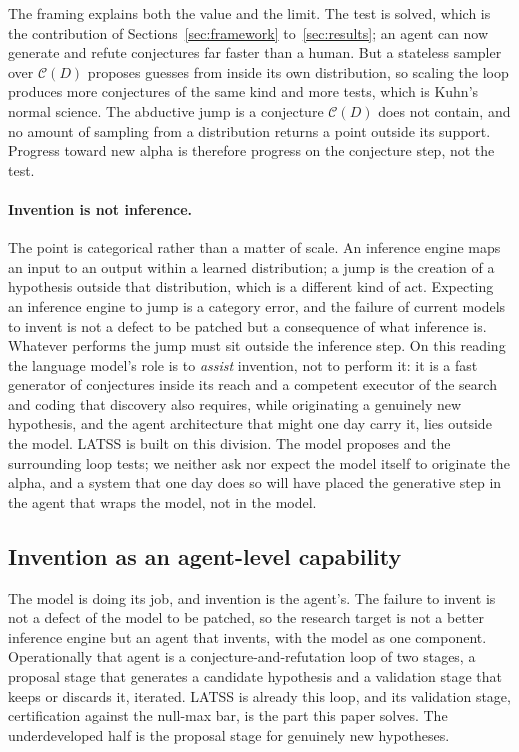 \documentclass[11pt]{article}
\begin{document}
The framing explains both the value and the limit. The test is solved, which is the contribution of
Sections~\ref{sec:framework} to~\ref{sec:results}; an agent can now generate and refute conjectures
far faster than a human. But a stateless sampler over $\mathcal{C}(D)$ proposes guesses from inside its
own distribution, so scaling the loop produces more conjectures of the same kind and more tests, which
is Kuhn's normal science. The abductive jump is a conjecture $\mathcal{C}(D)$ does not contain, and no
amount of sampling from a distribution returns a point outside its support. Progress toward new alpha
is therefore progress on the conjecture step, not the test.

\paragraph{Invention is not inference.} The point is categorical rather than a matter of scale. An
inference engine maps an input to an output within a learned distribution; a jump is the creation of a
hypothesis outside that distribution, which is a different kind of act. Expecting an inference engine to
jump is a category error, and the failure of current models to invent is not a defect to be patched but
a consequence of what inference is. Whatever performs the jump must sit outside the inference step. On
this reading the language model's role is to \emph{assist} invention, not to perform it: it is a fast
generator of conjectures inside its reach and a competent executor of the search and coding that
discovery also requires, while originating a genuinely new hypothesis, and the agent architecture that
might one day carry it, lies outside the model. LATSS is built on this division. The model proposes and
the surrounding loop tests; we neither ask nor expect the model itself to originate the alpha, and a
system that one day does so will have placed the generative step in the agent that wraps the model, not
in the model.

\subsection{Invention as an agent-level capability}
\label{sec:agent}

The model is doing its job, and invention is the agent's. The failure to
invent is not a defect of the model to be patched, so the research target is not a better inference
engine but an agent that invents, with the model as one component. Operationally that agent is a
conjecture-and-refutation loop of two stages, a proposal stage that generates a candidate hypothesis
and a validation stage that keeps or discards it, iterated. LATSS is already this loop, and its
validation stage, certification against the null-max bar, is the part this paper solves. The
underdeveloped half is the proposal stage for genuinely new hypotheses.
\end{document}
